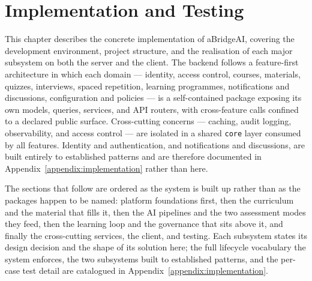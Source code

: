 \documentclass[twoside,final]{hcmut-report}
\begin{document}
\clearpage






\clearpage












\clearpage
\section{Implementation and Testing}
\label{sec:implementation}

This chapter describes the concrete implementation of aBridgeAI, covering the development environment, project structure, and the realisation of each major subsystem on both the server and the client. The backend follows a feature-first architecture in which each domain --- identity, access control, courses, materials, quizzes, interviews, spaced repetition, learning programmes, notifications and discussions, configuration and policies --- is a self-contained package exposing its own models, queries, services, and API routers, with cross-feature calls confined to a declared public surface. Cross-cutting concerns — caching, audit logging, observability, and access control — are isolated in a shared \texttt{core} layer consumed by all features. Identity and authentication, and notifications and discussions, are built entirely to established patterns and are therefore documented in Appendix~\ref{appendix:implementation} rather than here.

The sections that follow are ordered as the system is built up rather than as the packages happen to be named: platform foundations first, then the curriculum and the material that fills it, then the AI pipelines and the two assessment modes they feed, then the learning loop and the governance that sits above it, and finally the cross-cutting services, the client, and testing. Each subsystem states its design decision and the shape of its solution here; the full lifecycle vocabulary the system enforces, the two subsystems built to established patterns, and the per-case test detail are catalogued in Appendix~\ref{appendix:implementation}.
\end{document}
